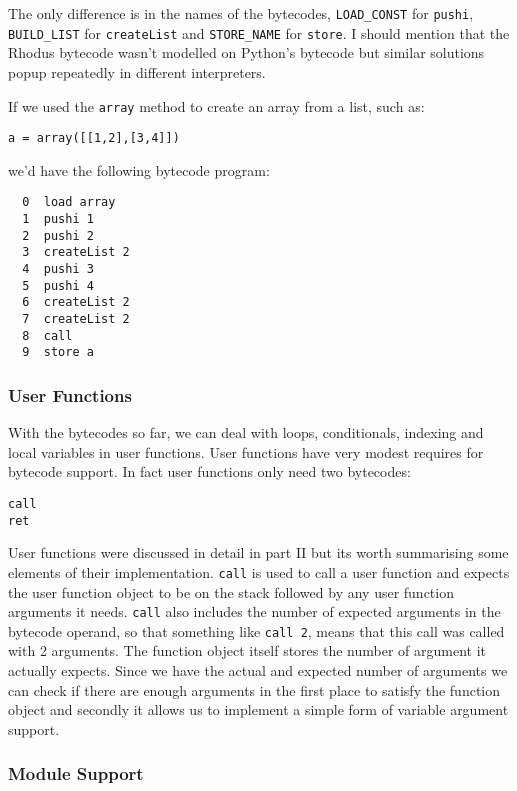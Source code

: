The only difference is in the names of the bytecodes, {\tt LOAD\_CONST} for {\tt pushi}, {\tt BUILD\_LIST} for {\tt createList} and {\tt STORE\_NAME} for {\tt store}. I should mention that the Rhodus bytecode wasn't modelled on Python's bytecode but similar solutions popup repeatedly in different interpreters.

If we used the {\tt array} method to create an array from a list, such as:

\begin{lstlisting}
a = array([[1,2],[3,4]])
\end{lstlisting}

we'd have the following bytecode program:

\begin{lstlisting}
  0  load array
  1  pushi 1
  2  pushi 2
  3  createList 2
  4  pushi 3
  5  pushi 4
  6  createList 2
  7  createList 2
  8  call
  9  store a
\end{lstlisting}

\subsubsection*{User Functions}

With the bytecodes so far, we can deal with loops, conditionals, indexing and local variables in user functions. User functions have very modest requires for bytecode support. In fact user functions only need two bytecodes:

\begin{lstlisting}
call
ret
\end{lstlisting}

User functions were discussed in detail in part II but its worth summarising some elements of their implementation. {\tt call} is used to call a user function and expects the user function object to be on the stack followed by any user function arguments it needs. {\tt call} also includes the number of expected arguments in the bytecode operand, so that something like {\tt call 2}, means that this call was called with 2 arguments. The function object itself stores the number of argument it actually expects. Since we have the actual and expected number of arguments we can check if there are enough arguments in the first place to satisfy the function object and secondly it allows us to implement a simple form of variable argument support.

\subsubsection*{Module Support}

